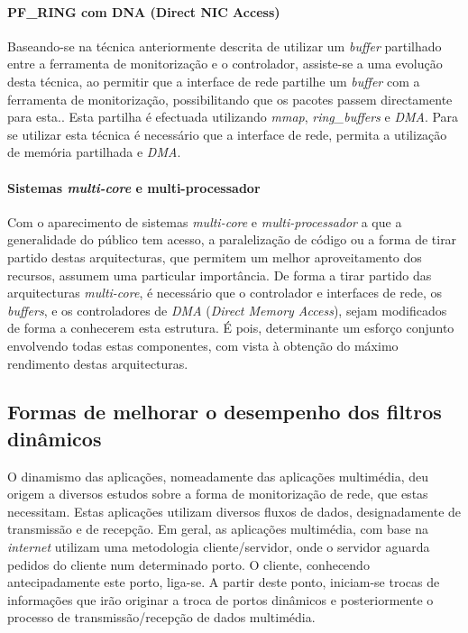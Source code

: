 \paragraph*{PF\_RING com DNA (Direct NIC Access)}
Baseando-se na técnica anteriormente descrita de utilizar um \textit{buffer} partilhado entre a ferramenta de monitorização e o controlador, assiste-se a uma evolução desta técnica, ao permitir que a interface de rede partilhe um \textit{buffer} com a ferramenta de monitorização, possibilitando que os pacotes passem directamente para esta.\cite{:IntroPF_RIDNADirecNICAcces}.
Esta partilha é efectuada utilizando \textit{mmap}, \textit{ring\_buffers} e \textit{DMA}.
Para se utilizar esta técnica é necessário que a interface de rede, permita a utilização de memória partilhada e \textit{DMA}.

\paragraph*{Sistemas \textit{multi-core} e multi-processador}

Com o aparecimento de sistemas \textit{multi-core} e \textit{multi-processador} a que a generalidade do público tem acesso, a paralelização de código ou a forma de tirar partido destas arquitecturas, que permitem um melhor aproveitamento dos recursos, assumem uma particular importância.
De forma a tirar partido das arquitecturas \textit{multi-core}, é necessário que o controlador e interfaces de rede, os \textit{buffers}, e os controladores de \textit{DMA} (\textit{Direct Memory Access}), sejam modificados de forma a conhecerem esta estrutura.
É pois, determinante um esforço conjunto envolvendo todas estas componentes, com vista à obtenção do máximo rendimento destas arquitecturas\cite{Deri:2010}.




\subsection{Formas de melhorar o desempenho dos filtros dinâmicos}
 O dinamismo das aplicações, nomeadamente das aplicações multimédia, deu origem a diversos estudos sobre a forma de monitorização de rede, que estas necessitam.
Estas aplicações utilizam diversos fluxos de dados, designadamente de transmissão e de recepção.
Em geral, as aplicações multimédia, com base na \textit{internet} utilizam uma metodologia cliente/servidor, onde o servidor aguarda pedidos do cliente num determinado porto.
O cliente, conhecendo antecipadamente este porto, liga-se.
A partir deste ponto, iniciam-se trocas de informações que irão originar a troca de portos dinâmicos e posteriormente o processo de transmissão/recepção de dados multimédia.


